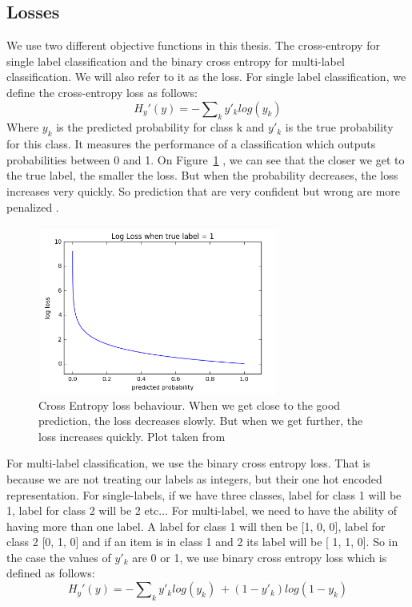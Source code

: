 \subsection{Losses}
We use two different objective functions in this thesis. The cross-entropy for single label classification and the binary cross entropy for multi-label classification. We will also refer to it as the loss. 
For single label classification, we define the cross-entropy loss as follows: \[H_y'(y) = - \sum\nolimits_k y'_k log(y_k)\] Where \(y_k\) is the predicted probability for class k and \(y'_k\) is the true probability for this class. It measures the performance of a classification which outputs probabilities between 0 and 1. On  Figure~\ref{fig:CE} , we can see that the closer we get to the true label, the smaller the loss. But when the probability decreases, the loss increases very quickly. So prediction that are very confident but wrong are more penalized \cite{nnbook}.
\begin{figure}[!htp]
    \centering
        \includegraphics[width=0.7\textwidth]{figures/02-cross_entropy}
        \caption[Cross Entropy loss behaviour]{Cross Entropy loss behaviour. When we get close to the good prediction, the loss decreases slowly. But when we get further, the loss increases quickly. Plot taken from \cite{celoss}}
        \label{fig:CE}
\end{figure}


For multi-label classification, we use the binary cross entropy loss. That is because we are not treating our labels as integers, but their one hot encoded representation. For single-labels, if we have three classes, label for class 1 will be 1, label for class 2 will be 2 etc...  For multi-label, we need to have the ability of having more than one label. A label for class 1 will then be [1, 0, 0], label for class 2 [0, 1, 0] and if an item is in class 1 and 2 its label will be [ 1, 1, 0]. So in the case the values of \(y'_k\) are 0 or 1, we use binary cross entropy loss which is defined as follows: \[H_y'(y) = - \sum\nolimits_k y'_k log(y_k)\ + (1 - y'_k)log(1 - y_k) \]

